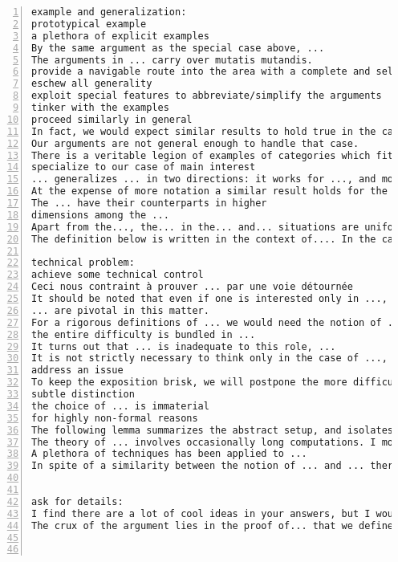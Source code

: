 \documentclass[11pt]{amsart}
\begin{document}
\begin{lstlisting}[numbers=left,numberstyle=\tiny,numbersep=10pt]
example and generalization:
prototypical example
a plethora of explicit examples
By the same argument as the special case above, ...
The arguments in ... carry over mutatis mutandis.
provide a navigable route into the area with a complete and self-contained account of the case ...
eschew all generality
exploit special features to abbreviate/simplify the arguments
tinker with the examples
proceed similarly in general
In fact, we would expect similar results to hold true in the case where ...
Our arguments are not general enough to handle that case.
There is a veritable legion of examples of categories which fit this paradigm:...
specialize to our case of main interest
... generalizes ... in two directions: it works for ..., and moreover it deals with ... instead of ...
At the expense of more notation a similar result holds for the other...
The ... have their counterparts in higher
dimensions among the ...
Apart from the..., the... in the... and... situations are uniform.
The definition below is written in the context of.... In the case of..., one has to replace... with....

technical problem:
achieve some technical control
Ceci nous contraint à prouver ... par une voie détournée
It should be noted that even if one is interested only in ..., the proofs often involve more general ...
... are pivotal in this matter.
For a rigorous definitions of ... we would need the notion of ..., which would take us too far away from the subject of ...
the entire difficulty is bundled in ...
It turns out that ... is inadequate to this role, ...
It is not strictly necessary to think only in the case of ..., but it certainly allows one to ignore some technical difficulties.
address an issue
To keep the exposition brisk, we will postpone the more difficult proofs until ...
subtle distinction
the choice of ... is immaterial
for highly non-formal reasons
The following lemma summarizes the abstract setup, and isolates the key property that we need to prove in our situation.
The theory of ... involves occasionally long computations. I moved several of them to the end of .... The reader may want to do some of them as exercises without looking first at these appendices.
A plethora of techniques has been applied to ...
In spite of a similarity between the notion of ... and ... there are essential differences.


ask for details:
I find there are a lot of cool ideas in your answers, but I would be grateful if you could be a bit more precise.
The crux of the argument lies in the proof of... that we define in more detail now.



\end{lstlisting}
\end{document}
